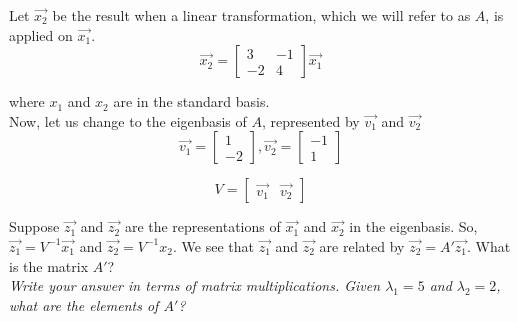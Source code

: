 \begin{enumerate}
\qitem Let $\vec{x_2}$ be the result when a linear transformation, which we will refer to as $A$, is applied on $\vec{x_1}$.
$$\vec{x_2} = 
\begin{bmatrix}
3 & -1 \\
-2 & 4
\end{bmatrix}
\vec{x_1}
$$

where $x_1$ and $x_2$ are in the standard basis. \\
Now, let us change to the eigenbasis of $A$, represented by $\vec{v_1}$ and $\vec{v_2}$
$$
\vec{v_1} = 
\begin{bmatrix}
1 \\
-2
\end{bmatrix}, 
\vec{v_2} =
\begin{bmatrix}
-1 \\
1
\end{bmatrix}
$$

$$ V =
\begin{bmatrix}
\vec{v_1} & \vec{v_2}
\end{bmatrix}
$$

Suppose $\vec{z_1}$ and $\vec{z_2}$ are the representations of $\vec{x_1}$ and $\vec{x_2}$ in the eigenbasis. 
So, $\vec{z_1} = V^{-1}\vec{x_1}$ and $\vec{z_2} = V^{-1}x_2$. 
We see that $\vec{z_1}$ and $\vec{z_2}$ are related by $\vec{z_2} = A'\vec{z_1}$. 
What is the matrix $A'$? \\
\textit{
Write your answer in terms of matrix multiplications. 
Given $\lambda_1 = 5$ and $\lambda_2 = 2$, what are the elements of $A'$?
} \\
\end{enumerate}
